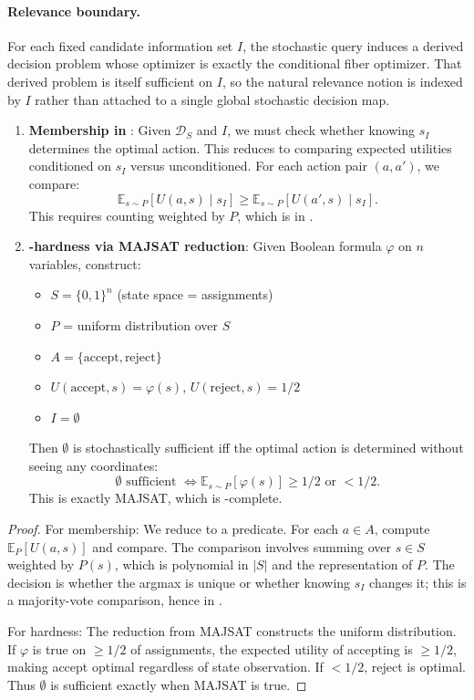 \paragraph{Relevance boundary.}
For each fixed candidate information set $I$, the stochastic query induces a
derived decision problem whose optimizer is exactly the conditional fiber
optimizer. That derived problem is itself sufficient on $I$, so the natural
relevance notion is indexed by $I$ rather than attached to a single global
stochastic decision map.

\begin{enumerate}
\item \textbf{Membership in \PP}: Given $\mathcal{D}_S$ and $I$, we must check whether knowing $s_I$ determines the optimal action. This reduces to comparing expected utilities conditioned on $s_I$ versus unconditioned. For each action pair $(a, a')$, we compare:
\[
\mathbb{E}_{s \sim P}[U(a,s) \mid s_I] \geq \mathbb{E}_{s \sim P}[U(a',s) \mid s_I].
\]
This requires counting weighted by $P$, which is in \PP.

\item \textbf{\PP-hardness via MAJSAT reduction}: Given Boolean formula $\varphi$ on $n$ variables, construct:
\begin{itemize}
\item $S = \{0,1\}^n$ (state space = assignments)
\item $P$ = uniform distribution over $S$
\item $A = \{\text{accept}, \text{reject}\}$
\item $U(\text{accept}, s) = \varphi(s)$, $U(\text{reject}, s) = 1/2$
\item $I = \emptyset$
\end{itemize}
Then $\emptyset$ is stochastically sufficient iff the optimal action is determined without seeing any coordinates:
\[
\emptyset \text{ sufficient } \iff \mathbb{E}_{s \sim P}[\varphi(s)] \geq 1/2 \text{ or } < 1/2.
\]
This is exactly MAJSAT, which is \PP-complete.
\end{enumerate}


\begin{proof}
For membership: We reduce to a \PP predicate. For each $a \in A$, compute $\mathbb{E}_P[U(a,s)]$ and compare. The comparison involves summing over $s \in S$ weighted by $P(s)$, which is polynomial in $|S|$ and the representation of $P$. The decision is whether the argmax is unique or whether knowing $s_I$ changes it; this is a majority-vote comparison, hence in \PP.

For hardness: The reduction from MAJSAT constructs the uniform distribution. If $\varphi$ is true on $\geq 1/2$ of assignments, the expected utility of accepting is $\geq 1/2$, making accept optimal regardless of state observation. If $< 1/2$, reject is optimal. Thus $\emptyset$ is sufficient exactly when MAJSAT is true.
\end{proof}

